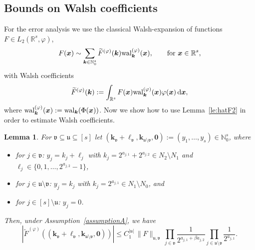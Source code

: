 \documentclass[namedate,webpdf,imanum]{ima-authoring-arxiv}%
\theoremstyle{thmstyletwo}%
\newtheorem{lemma}{Lemma}
\numberwithin{equation}{section}
\newcommand{\rd}{\, {\rm d}}
\newcommand{\wal}{{\rm wal}}
\newcommand{\bsx}{\boldsymbol{x}}
\newcommand{\bsk}{\boldsymbol{k}}
\newcommand{\bsell}{\boldsymbol{\ell}}
\newcommand{\bszero}{\boldsymbol{0}}
\newcommand{\uu}{\mathfrak{u}}
\newcommand{\vv}{\mathfrak{v}}
\newcommand{\NN}{\mathbb{N}}
\newcommand{\RR}{\mathbb{R}}
\begin{document}
\subsection{Bounds on Walsh coefficients}\label{subsec:Walcoeff}


For the error analysis we use the classical Walsh-expansion of functions $F \in L_2(\RR^s,\varphi)$, $$F(\bsx) \sim \sum_{\bsk \in \NN_0^s} \widetilde{F}^{(\varphi)}(\bsk) \wal_{\bsk}^{(\varphi)}(\bsx),\qquad \mbox{for } \bsx \in \RR^s,$$ with Walsh coefficients $$\widetilde{F}^{(\varphi)}(\bsk):=\int_{\RR^s}F(\bsx) \wal_{\bsk}^{(\varphi)}(\bsx) \varphi(\bsx)\rd \bsx,$$ where $\wal_{\bsk}^{(\varphi)}(\bsx):=\wal_{\bsk}(\Phi(\bsx))$. Now we show how to use Lemma~\ref{le:hatF2} in order to estimate Walsh coefficients. 

\begin{lemma}\label{est:wal:F}
For $\vv \subseteq \uu \subseteq [s]$ let $(\bsk_\vv+\bsell_\vv,\bsk_{\uu \setminus \vv},\bszero):=(y_1,\ldots,y_s)\in \NN_0^s$, where 
\begin{itemize}
    \item for $j \in \vv$: $y_j=k_j+\ell_j$ with $k_j=2^{a_{j,1}}+2^{a_{j,2}} \in N_2 \setminus N_1$ and $\ell_j \in \{0,1,\ldots,2^{a_{j,2}}-1\}$,
    \item for $j \in \uu \setminus \vv$: $y_j=k_j$ with $k_j = 2^{a_{j,1}} \in N_1\setminus N_0$, and 
    \item for $j \in [s]\setminus \uu$: $y_j=0$.
\end{itemize}
Then, under Assumption~\ref{assumptionA},  we have
\begin{equation*}%
|\widetilde{F}^{(\varphi)}((\bsk_\vv+\bsell_\vv,\bsk_{\uu \setminus \vv},\bszero))| \le  C_1^{|\uu|} \, \|F\|_{\uu, \vv} \, \prod_{j \in \vv} \frac{1}{2^{a_{j,1} + \beta a_{j,2}}} \prod_{j \in \uu \setminus \vv} \frac{1}{2^{a_{j,1}}}.
\end{equation*}
\end{lemma}
\end{document}
